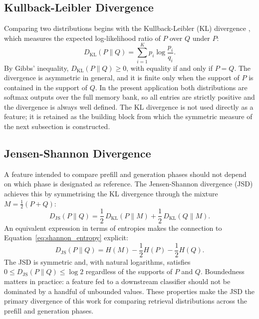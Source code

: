 \subsection{Kullback-Leibler Divergence}
\label{subsec:kl_divergence}

Comparing two distributions begins with the Kullback-Leibler (KL) divergence
\citep{kullback1951information}, which measures the expected log-likelihood
ratio of $P$ over $Q$ under $P$:
\begin{equation}
    D_{\mathrm{KL}}(P \| Q) = \sum_{i=1}^{K} p_i \log \frac{p_i}{q_i}.
    \label{eq:kl_divergence}
\end{equation}
By Gibbs' inequality, $D_{\mathrm{KL}}(P \| Q) \geq 0$, with equality if and
only if $P = Q$. The divergence is asymmetric in general, and it is finite
only when the support of $P$ is contained in the support of $Q$. In the
present application both distributions are softmax outputs over the full
memory bank, so all entries are strictly positive and the divergence is
always well defined. The KL divergence is not used directly as a feature; it
is retained as the building block from which the symmetric measure of the
next subsection is constructed.

\subsection{Jensen-Shannon Divergence}
\label{subsec:js_divergence}

A feature intended to compare prefill and generation phases should not depend
on which phase is designated as reference. The Jensen-Shannon divergence
(JSD) \citep{lin1991divergence} achieves this by symmetrising the KL
divergence through the mixture $M = \tfrac{1}{2}(P + Q)$:
\begin{equation}
    D_{\mathrm{JS}}(P \| Q)
    =
    \frac{1}{2}\,D_{\mathrm{KL}}(P \| M)
    +
    \frac{1}{2}\,D_{\mathrm{KL}}(Q \| M).
    \label{eq:js_divergence}
\end{equation}
An equivalent expression in terms of entropies makes the connection to
Equation~\eqref{eq:shannon_entropy} explicit:
\begin{equation}
    D_{\mathrm{JS}}(P \| Q)
    =
    H(M) - \frac{1}{2}H(P) - \frac{1}{2}H(Q).
    \label{eq:js_entropy_form}
\end{equation}
The JSD is symmetric and, with natural logarithms, satisfies
$0 \leq D_{\mathrm{JS}}(P \| Q) \leq \log 2$ regardless of the supports of
$P$ and $Q$. Boundedness matters in practice: a feature fed to a downstream
classifier should not be dominated by a handful of unbounded values. These
properties make the JSD the primary divergence of this work for comparing
retrieval distributions across the prefill and generation phases.


